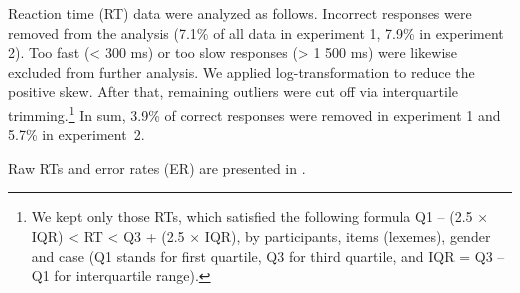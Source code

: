 \documentclass[output=paper, modfonts,newtxmath,hidelinks]{langscibook}
\begin{document}
Reaction time (RT) data were analyzed as follows. Incorrect responses were removed from the analysis (7.1\% of all data in experiment 1, 7.9\% in experiment 2). Too fast (< 300 ms) or too slow responses (> 1 500 ms) were likewise excluded from further analysis. We applied log-transformation to reduce the positive skew. After that, remaining outliers were cut off via interquartile trimming.\footnote{We kept only those RTs, which satisfied the following formula Q1 – (2.5 × IQR) < RT < Q3 + (2.5 × IQR), by participants, items (lexemes), gender and case (Q1 stands for first quartile, Q3 for third quartile, and IQR = Q3 – Q1 for interquartile range).} In sum, 3.9\% of correct responses were removed in experiment 1 and 5.7\% in experiment~2.

Raw RTs and error rates (ER) are presented in .
\begin{table}
    \caption{Mean RT (in ms) and ER (in \%) to feminine and masculine nouns in different cases and numbers (\textit{SD} is provided in brackets)}
    \label{tab:descrSg}
\end{table}
\end{document}
